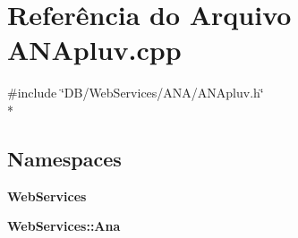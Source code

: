 \section{Referência do Arquivo A\+N\+Apluv.\+cpp}
\label{_a_n_apluv_8cpp}
{\ttfamily \#include \char`\"{}D\+B/\+Web\+Services/\+A\+N\+A/\+A\+N\+Apluv.\+h\char`\"{}}\\*
\subsection*{Namespaces}
\begin{DoxyCompactItemize}
\item 
 {\bf Web\+Services}
\item 
 {\bf Web\+Services\+::\+Ana}
\end{DoxyCompactItemize}
